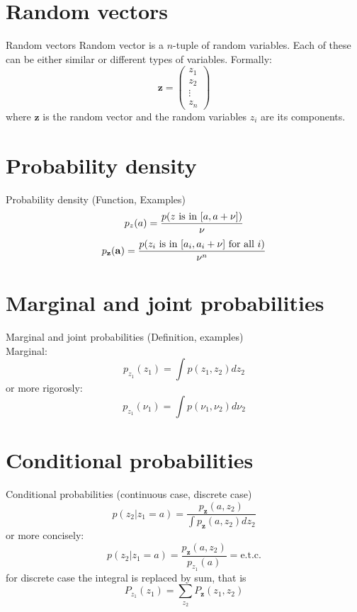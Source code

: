 \documentclass{beamer}
\begin{document}
\section{Random vectors}

\begin{frame}{Random vectors}
  Random vector is a $n$-tuple of random variables. Each of these can be either
  similar or different types of variables. Formally:
  \[ \mathbf{z} =  \begin{pmatrix} z_1 \\ z_2 \\ \vdots \\ z_n \end{pmatrix} \]
  where $\mathbf{z}$ is the random vector and the random variables $z_i$ are
  its components.
\end{frame}

\section{Probability density}

\begin{frame}{Probability density}
  (Function, Examples)
  \[ p_z(a) = \frac{p(\textnormal{$z$ is in $[a, a + \nu]$})}{\nu}\]
  \[ p_{\mathbf{z}}(\mathbf{a}) =
  \frac{p(\textnormal{$z_i$ is in $[a_i, a_i + \nu]$ for all $i$})}{\nu^n}\]
\end{frame}

\section{Marginal and joint probabilities}

\begin{frame}{Marginal and joint probabilities}
  (Definition, examples)\\
  Marginal:
  \[ p_{z_1}(z_1) =  \int p(z_1, z_2)dz_2\]
  or more rigorosly:
  \[ p_{z_1}(\nu_1) =  \int p(\nu_1, \nu_2)d\nu_2\]
\end{frame}

\section{Conditional probabilities}

\begin{frame}{Conditional probabilities}
  (continuous case, discrete case)
  \[
  p(z_2|z_1 = a) =
  \frac{ p_{\mathbf{z}}(a, z_2)}{\int p_{\mathbf{z}}(a, z_2)dz_2}
  \]
  or more concisely:
  \[
  p(z_2|z_1 = a) =
  \frac{ p_{\mathbf{z}}(a, z_2)}{p_{z_1}(a)} = \text{e.t.c.}
  \]
  for discrete case the integral is replaced by sum, that is
  \[ P_{z_1}(z_1) = \sum_{z_2}P_{\mathbf{z}}(z_1, z_2)\]
\end{frame}
\end{document}
